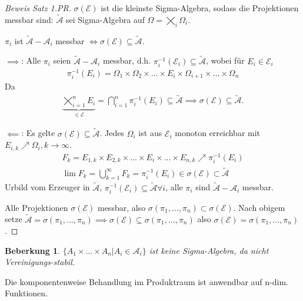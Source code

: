 \documentclass[]{article}
\newtheorem*{remark}{Beberkung}
\begin{document}
\begin{proof}[Beweis Satz 1.PR]
$\sigma(\mathcal{E})$ ist die kleinste Sigma-Algebra, sodass die Projektionen messbar sind: $\tilde{\mathcal{A}}$ sei Sigma-Algebra auf $\Omega = \bigtimes_i \Omega_i$.

$\pi_i$ ist $\tilde{\mathcal{A}}-\mathcal{A}_i$ messbar $\iff \sigma(\mathcal{E}) \subseteq \tilde{\mathcal{A}}$.

$\implies$: Alle $\pi_i$ seien $\tilde{\mathcal{A}}-\mathcal{A}_i$ messbar, d.h. $\pi_i^{-1}(\mathcal{E}_i) \subseteq \tilde{\mathcal{A}}$, wobei für $E_i \in \mathcal{E}_i$
\begin{align*}
	\pi_i^{-1}(E_i) = \Omega_1\times\Omega_2\times ...\times E_i\times\Omega_{i+1}\times ...\times\Omega_n
\end{align*}
Da
\begin{align*}
	\underbrace{\bigtimes_{i=1}^{n}E_i}_{\in \mathcal{E}} = \bigcap_{i=1}^{n}\pi_i^{-1}(E_i) \subseteq \tilde{\mathcal{A}} \implies \sigma(\mathcal{E}) \subseteq \tilde{\mathcal{A}}.
\end{align*}

$\impliedby$: Es gelte $\sigma(\mathcal{E}) \subseteq \tilde{\mathcal{A}}$.
Jedes $\Omega_i$ ist aus $\mathcal{E}_i$ monoton erreichbar mit $E_{i,k}\nearrow \Omega_i, k\to\infty$.
\begin{align*}
	F_k = E_{1,k}\times E_{2,k}\times ... \times E_i \times ... \times E_{n,k} \nearrow \pi_i^{-1}(E_i) \\
	\lim F_k = \bigcup_{k=1}^{\infty}F_k = \pi_i^{-1}(E_i) \in \sigma(\mathcal{E}) \subset \tilde{\mathcal{A}}
\end{align*}
Urbild vom Erzeuger in $\tilde{\mathcal{A}}$, $\pi_i^{-1}(\mathcal{E}_i)\subseteq \tilde{\mathcal{A}} \forall i$, alle $\pi_i$ sind $\tilde{\mathcal{A}}-\mathcal{A}_i$ messbar.

Alle Projektionen $\sigma(\mathcal{E})$ messbar, also $\sigma(\pi_1,...,\pi_n) \subset \sigma(\mathcal{E})$. Nach obigem setze $\tilde{\mathcal{A}}=\sigma(\pi_1,...,\pi_n) \implies \sigma(\mathcal{E}) \subseteq \sigma(\pi_1,...,\pi_n)$ also $\sigma(\mathcal{E}) = \sigma(\pi_1,...,\pi_n)$.
\end{proof}

\begin{remark}
	$\{A_1\times ...\times A_n | A_i \in \mathcal{A}_i\}$ ist keine Sigma-Algebra, da nicht Vereinigungs-stabil.
\end{remark}

Die komponentenweise Behandlung im Produktraum ist anwendbar auf n-dim. Funktionen.
\end{document}
